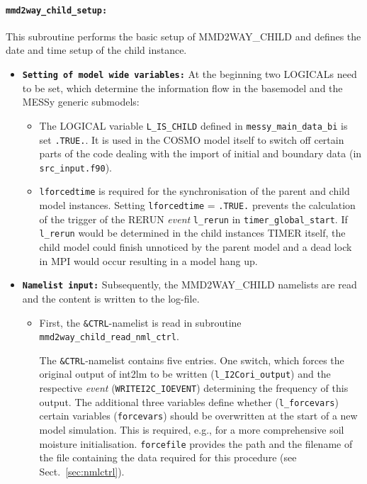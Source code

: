 \documentclass[11pt,twoside]{article}
\begin{document}
\paragraph{\tt \bf mmd2way\_child\_setup: \\} 
This subroutine performs the basic setup of MMD2WAY\_CHILD and defines the
date and time setup of the child instance.
\begin{itemize}
\item {\tt \bf Setting of model wide variables:}
 At the beginning two {\footnotesize LOGICALs} need to be set,
 which determine the information flow in the basemodel and the MESSy generic 
submodels:
\begin{itemize}
\item The {\footnotesize LOGICAL} variable \verb|L_IS_CHILD| defined in 
\verb|messy_main_data_bi| is set 
\verb|.TRUE.|. It is used in the COSMO model itself to 
 switch off certain parts of the code dealing with the import of initial and 
boundary data (in \verb|src_input.f90|).
\item 
\verb|lforcedtime| is required for the 
synchronisation of the parent and child
model instances. Setting  \verb|lforcedtime| = \verb|.TRUE.| prevents
 the calculation of the trigger of the {\footnotesize RERUN} {\it
 event} \verb|l_rerun| in \verb|timer_global_start|. 
If \verb|l_rerun| would be determined in the child instances TIMER itself,
 the child model could finish unnoticed by the parent model and a dead lock in
 MPI would occur resulting in a model hang up.
\end{itemize}

\item {\tt \bf Namelist input:} Subsequently, the MMD2WAY\_CHILD namelists are read and the
content is written to the log-file. 
\begin{itemize} 
\item First, the \verb|&CTRL|-namelist is read in subroutine 
\verb|mmd2way_child_read_nml_ctrl|.  

The \verb|&CTRL|-namelist contains five entries. One switch, which
forces the original output of int2lm to be written
(\verb|l_I2Cori_output|) and the respective {\it event}
(\verb|WRITEI2C_IOEVENT|) determining the frequency of this
output.
The additional three variables define whether (\verb|l_forcevars|)
certain variables (\verb|forcevars|) should be overwritten at the
start of a new model simulation. This is required, e.g., for a more
comprehensive soil moisture initialisation. \verb|forcefile| provides
the path and the filename of the file containing the data required for
this procedure (see Sect.\ \ref{sec:nmlctrl}).



\end{itemize}
\end{itemize}
\end{document}
